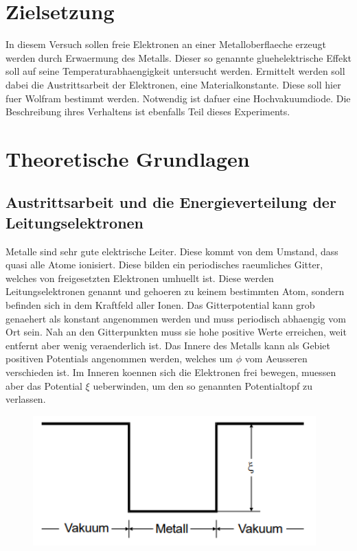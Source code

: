 \section{Zielsetzung}
In diesem Versuch sollen freie Elektronen an einer Metalloberflaeche erzeugt werden durch Erwaermung des Metalls. Dieser so genannte gluehelektrische Effekt soll auf seine Temperaturabhaengigkeit untersucht werden. Ermittelt werden soll dabei die Austrittsarbeit der Elektronen, eine Materialkonstante. Diese soll hier fuer Wolfram bestimmt werden. Notwendig ist dafuer eine Hochvakuumdiode. Die Beschreibung ihres Verhaltens ist ebenfalls Teil dieses Experiments.
\section{Theoretische Grundlagen}
\subsection{Austrittsarbeit und die Energieverteilung der Leitungselektronen}
Metalle sind sehr gute elektrische Leiter. Diese kommt von dem Umstand, dass quasi alle Atome ionisiert. Diese bilden ein periodisches raeumliches Gitter, welches von freigesetzten Elektronen umhuellt ist. Diese werden Leitungselektronen genannt und gehoeren zu keinem bestimmten Atom, sondern befinden sich in dem Kraftfeld aller Ionen. Das Gitterpotential kann grob genaehert als konstant angenommen werden und muss periodisch abhaengig vom Ort sein. Nah an den Gitterpunkten muss sie hohe positive Werte erreichen, weit entfernt aber wenig veraenderlich ist. Das Innere des Metalls kann als Gebiet positiven Potentials angenommen werden, welches um $\phi$ vom Aeusseren verschieden ist. Im Inneren koennen sich die Elektronen frei bewegen, muessen aber das Potential $\xi$ ueberwinden, um den so genannten Potentialtopf zu verlassen. 
\begin{figure}[H]
    \centering
    \captionsetup{justification=centering}
    \includegraphics[height=5cm]{"potentialtopf_emission.png"}
    \label{Fig:Potentialtopf}
\end{figure}
